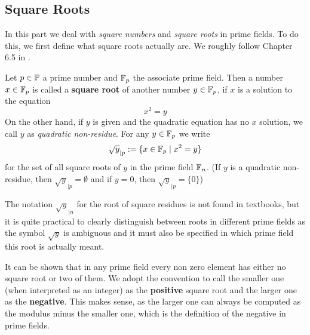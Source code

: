 \subsection{Square Roots}
In this part we deal with \textit{square numbers} and \textit{square roots} in prime fields. To do this, we first define what square roots actually are. We roughly follow Chapter 6.5 in \cite{HW}.
\begin{definition} Let
$p \in \mathbb{P} $ a prime number and $\mathbb{F}_p $ the associate prime field. Then a number $x\in \mathbb{F}_p$ is called a \textbf{square root} of another number $y\in\mathbb{F}_p$, if $x$ is a solution to the equation
\begin{equation}
x^2 = y
\end{equation}
On the other hand, if $y$ is given and the quadratic equation has no $x$ solution, we call $ y $ as \textit{quadratic non-residue}. For any $ y \in \mathbb{F}_p $ we write
\begin{equation}
\sqrt{y} _{| p}: = \{x \in \mathbb{F}_p \; | \; x^2 = y \}
\end{equation}
for the set of all square roots of $ y $ in the prime field
$ \mathbb{F}_n $. (If $ y $ is a quadratic non-residue, then $ \sqrt{y}_{| p} = \emptyset $ and if $ y = 0 $, then $ \sqrt{y}_{| p} = \{0 \} $)
\end{definition}
\begin{remark}
The notation $ \sqrt{y}_{| n} $ for the root of square residues is not found in textbooks, but it is quite practical to clearly distinguish between roots in different prime fields as the symbol $ \sqrt{y} $ is  ambiguous and it must also be specified in which prime field this root is actually meant.
\end{remark}
\begin{remark}
It can be shown that in any prime field every non zero element has either no square root or two of them. We adopt the convention to call the smaller one (when interpreted as an integer) as the \textbf{positive} square root and the larger one as the \textbf{negative}. This makes sense, as the larger one can always be computed as the modulus minus the smaller one, which is the definition of the negative in prime fields. 
\end{remark}

